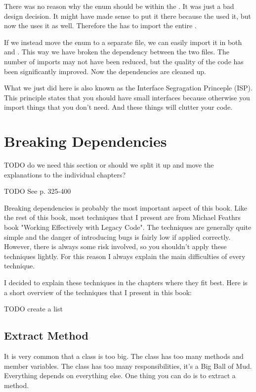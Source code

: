 There was no reason why the  enum should be within the . It was just a bad design decision. It might have made sense to put it there because the  used it, but now the  uses it as well. Therefore the  has to import the entire .

If we instead move the  enum to a separate file, we can easily import it in both  and . This way we have broken the dependency between the two files. The number of imports may not have been reduced, but the quality of the code has been significantly improved. Now the dependencies are cleaned up.

What we just did here is also known as the Interface Segragation Princeple (ISP). This principle states that you should have small interfaces because otherwise you import things that you don't need. And these things will clutter your code.

\section{Breaking Dependencies}

TODO do we need this section or should we split it up and move the explanations to the individual chapters?

TODO See p. 325-400

Breaking dependencies is probably the most important aspect of this book. Like the rest of this book, most techniques that I present are from Michael Feathrs book "Working Effectively with Legacy Code". The techniques are generally quite simple and the danger of introducing bugs is fairly low if applied correctly. However, there is always some risk involved, so you shouldn't apply these techniques lightly. For this reason I always explain the main difficulties of every technique.

I decided to explain these techniques in the chapters where they fit best. Here is a short overview of the techniques that I present in this book:

TODO create a list

\subsection{Extract Method}\label{sec:extract_method}

It is very common that a class is too big. The class has too many methods and member variables. The class has too many responsibilities, it's a Big Ball of Mud. Everything depends on everything else. One thing you can do is to extract a method.

